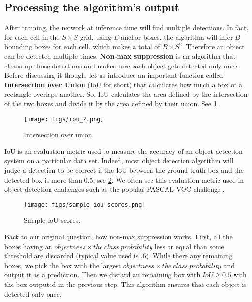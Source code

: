 \subsection{Processing the algorithm's output}\label{IOU}

After training, the network at inference time will find multiple detections. In fact, for each cell in the $S \times S$ grid, using $B$ anchor
boxes, the algorithm will infer $B$ bounding boxes for each cell, which makes a total of $B \times S^2$. Therefore an object can be detected
multiple times.  \textbf{Non-max suppression} is an algorithm that cleans up those detections and makes sure each object gets detected only once.
Before discussing it though, let us introduce an important function called \textbf{Intersection over Union} (IoU for short) that calculates how much
a box or a rectangle overlaps another. So, IoU calculates the area defined by the intersection of the two boxes and divide it by the area defined by
their union. See \cref{fig:iou}.

\begin{figure}[!htbp]
  \centering
  \texttt{[image: figs/iou\_2.png]}
  \caption{Intersection over union.}\label{fig:iou}
\end{figure}

IoU is an evaluation metric used to measure the accuracy of an object detection system on a particular data set. Indeed, most object detection
algorithm will judge a detection to be correct if the IoU between the ground truth box and the detected box is more than 0.5, see
\cref{fig:iou_sample}. We often see this evaluation metric used in object detection challenges such as the popular PASCAL VOC challenge \cite{pascal}. \\

\begin{figure}[!htbp]
  \centering
  \texttt{[image: figs/sample\_iou\_scores.png]}
  \caption{Sample IoU scores.}\label{fig:iou_sample}
\end{figure}

Back to our original question, how non-max suppression works. First, all the boxes having an $objectness \times the\ class\ probability$ less or
equal than some threshold are discarded (typical value used is .6). While there any remaining boxes, we pick the box with the largest $objectness
\times the\ class\ probability$ and output it as a prediction. Then we discard an remaining box with $IoU \geq 0.5$ with the box outputed in the
previous step. This algorithm ensures that each object is detected only once. \\

